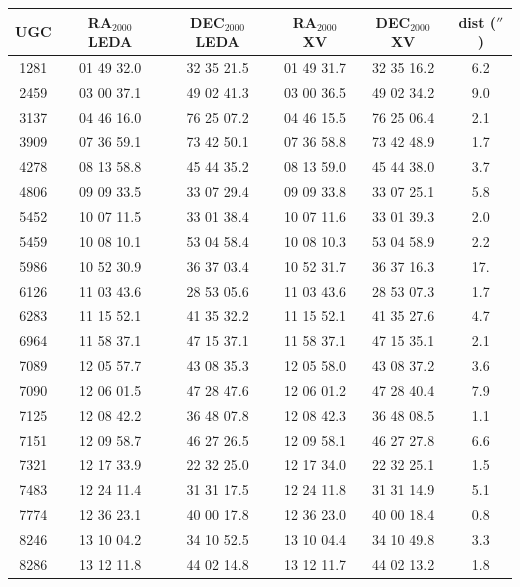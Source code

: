 \documentclass{aa}
\begin{document}
\begin{center}
\begin{table}
\begin{center}
\begin{tabular}{cccccc}
\hline
UGC & RA$_{2000}$ LEDA & DEC$_{2000}$ LEDA & RA$_{2000}$ XV &DEC$_{2000}$ XV & dist ($''$) \\
\hline
\hline
1281 & 01 49 32.0 & 32 35 21.5 & 01 49 31.7 & 32 35 16.2 & 6.2  \\
2459 & 03 00 37.1 & 49 02 41.3 & 03 00 36.5 & 49 02 34.2 & 9.0  \\
3137 & 04 46 16.0 & 76 25 07.2 & 04 46 15.5 & 76 25 06.4 & 2.1  \\
3909 & 07 36 59.1 & 73 42 50.1 & 07 36 58.8 & 73 42 48.9 & 1.7  \\
4278 & 08 13 58.8 & 45 44 35.2 & 08 13 59.0 & 45 44 38.0 & 3.7  \\
4806 & 09 09 33.5 & 33 07 29.4 & 09 09 33.8 & 33 07 25.1 & 5.8  \\
5452 & 10 07 11.5 & 33 01 38.4 & 10 07 11.6 & 33 01 39.3 & 2.0  \\
5459 & 10 08 10.1 & 53 04 58.4 & 10 08 10.3 & 53 04 58.9 & 2.2  \\
5986 & 10 52 30.9 & 36 37 03.4 & 10 52 31.7 & 36 37 16.3 & 17.  \\
6126 & 11 03 43.6 & 28 53 05.6 & 11 03 43.6 & 28 53 07.3 & 1.7  \\
6283 & 11 15 52.1 & 41 35 32.2 & 11 15 52.1 & 41 35 27.6 & 4.7  \\
6964 & 11 58 37.1 & 47 15 37.1 & 11 58 37.1 & 47 15 35.1 & 2.1  \\
7089 & 12 05 57.7 & 43 08 35.3 & 12 05 58.0 & 43 08 37.2 & 3.6  \\
7090 & 12 06 01.5 & 47 28 47.6 & 12 06 01.2 & 47 28 40.4 & 7.9  \\
7125 & 12 08 42.2 & 36 48 07.8 & 12 08 42.3 & 36 48 08.5 & 1.1  \\
7151 & 12 09 58.7 & 46 27 26.5 & 12 09 58.1 & 46 27 27.8 & 6.6  \\
7321 & 12 17 33.9 & 22 32 25.0 & 12 17 34.0 & 22 32 25.1 & 1.5  \\
7483 & 12 24 11.4 & 31 31 17.5 & 12 24 11.8 & 31 31 14.9 & 5.1  \\
7774 & 12 36 23.1 & 40 00 17.8 & 12 36 23.0 & 40 00 18.4 & 0.8  \\
8246 & 13 10 04.2 & 34 10 52.5 & 13 10 04.4 & 34 10 49.8 & 3.3  \\
8286 & 13 12 11.8 & 44 02 14.8 & 13 12 11.7 & 44 02 13.2 & 1.8  \\

\end{tabular}
\end{center}
\end{table}
\end{center}
\end{document}
